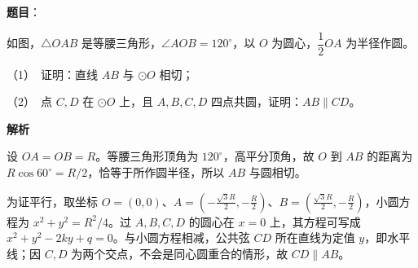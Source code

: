\begin{answer}

\textbf{题目}：

如图，\(\triangle OAB\) 是等腰三角形，\(\angle AOB=120^\circ\)，以 \(O\) 为圆心，\(\dfrac{1}{2}OA\) 为半径作圆。
\nopagebreak[4]
\begin{center}\end{center}
\nopagebreak[4]
   （1）　证明：直线 \(AB\) 与 \(\odot O\) 相切；

   （2）　点 \(C,D\) 在 \(\odot O\) 上，且 \(A,B,C,D\) 四点共圆，证明：\(AB\parallel CD\)。

\textbf{解析}


设 \(OA=OB=R\)。等腰三角形顶角为 \(120^\circ\)，高平分顶角，故 \(O\) 到 \(AB\) 的距离为 \(R\cos60^\circ=R/2\)，恰等于所作圆半径，所以 \(AB\) 与圆相切。


为证平行，取坐标 \(O=(0,0)\)、\(A=(-\frac{\sqrt3R}{2},-\frac R2)\)、\(B=(\frac{\sqrt3R}{2},-\frac R2)\)，小圆方程为 \(x^2+y^2=R^2/4\)。过 \(A,B,C,D\) 的圆心在 \(x=0\) 上，其方程可写成 \(x^2+y^2-2ky+q=0\)。与小圆方程相减，公共弦 \(CD\) 所在直线为定值 \(y\)，即水平线；因 \(C,D\) 为两个交点，不会是同心圆重合的情形，故 \(CD\parallel AB\)。



\end{answer}
